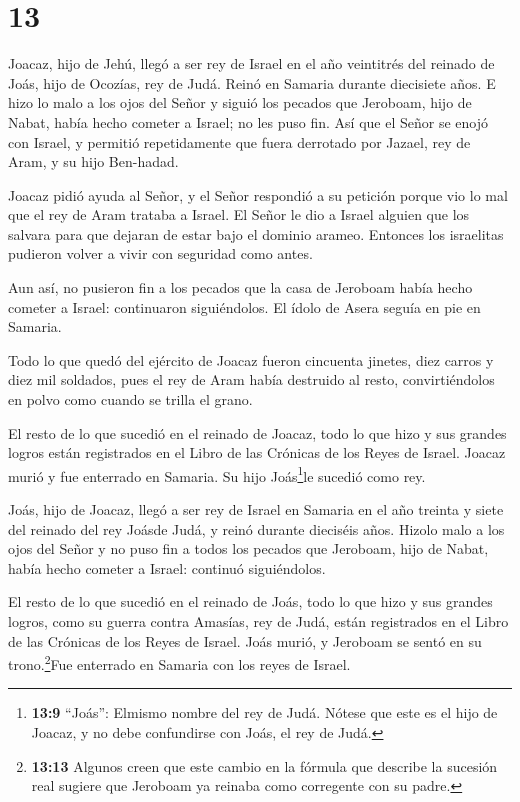 \hypertarget{section-12}{%
\section{13}\label{section-12}}

 Joacaz, hijo de Jehú, llegó a ser rey de Israel en el año
veintitrés del reinado de Joás, hijo de Ocozías, rey de Judá. Reinó en
Samaria durante diecisiete años.  E hizo lo malo a los ojos
del Señor y siguió los pecados que Jeroboam, hijo de Nabat, había hecho
cometer a Israel; no les puso fin.  Así que el Señor se
enojó con Israel, y permitió repetidamente que fuera derrotado por
Jazael, rey de Aram, y su hijo Ben-hadad.

 Joacaz pidió ayuda al Señor, y el Señor respondió a su
petición porque vio lo mal que el rey de Aram trataba a Israel.
 El Señor le dio a Israel alguien que los salvara para que
dejaran de estar bajo el dominio arameo. Entonces los israelitas
pudieron volver a vivir con seguridad como antes.

 Aun así, no pusieron fin a los pecados que la casa de
Jeroboam había hecho cometer a Israel: continuaron siguiéndolos. El
ídolo de Asera seguía en pie en Samaria.

 Todo lo que quedó del ejército de Joacaz fueron cincuenta
jinetes, diez carros y diez mil soldados, pues el rey de Aram había
destruido al resto, convirtiéndolos en polvo como cuando se trilla el
grano.

 El resto de lo que sucedió en el reinado de Joacaz, todo lo
que hizo y sus grandes logros están registrados en el Libro de las
Crónicas de los Reyes de Israel.  Joacaz murió y fue
enterrado en Samaria. Su hijo Joás\footnote{\textbf{13:9} ``Joás'':
  Elmismo nombre del rey de Judá. Nótese que este es el hijo de Joacaz,
  y no debe confundirse con Joás, el rey de Judá.}le sucedió como rey.

 Joás, hijo de Joacaz, llegó a ser rey de Israel en Samaria
en el año treinta y siete del reinado del rey Joásde Judá, y reinó
durante dieciséis años.  Hizolo malo a los ojos del Señor y
no puso fin a todos los pecados que Jeroboam, hijo de Nabat, había hecho
cometer a Israel: continuó siguiéndolos.

 El resto de lo que sucedió en el reinado de Joás, todo lo
que hizo y sus grandes logros, como su guerra contra Amasías, rey de
Judá, están registrados en el Libro de las Crónicas de los Reyes de
Israel.  Joás murió, y Jeroboam se sentó en su
trono.\footnote{\textbf{13:13} Algunos creen que este cambio en la
  fórmula que describe la sucesión real sugiere que Jeroboam ya reinaba
  como corregente con su padre.}Fue enterrado en Samaria con los reyes
de Israel.

